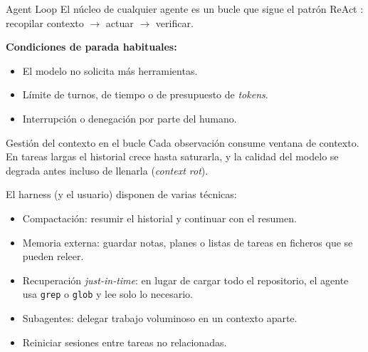 \begin{frame}{Agent Loop}
El núcleo de cualquier agente es un \alert{bucle} que sigue el patrón ReAct \cite{yao2023react}: \alert{recopilar contexto $\rightarrow$ actuar $\rightarrow$ verificar}.
 
\begin{figure}
    \centering
\end{figure}
 
\textbf{Condiciones de parada habituales:}
\begin{itemize}
    \item El modelo no solicita más herramientas.
    \item Límite de turnos, de tiempo o de presupuesto de \textit{tokens}.
    \item Interrupción o denegación por parte del humano.
\end{itemize}
\end{frame}
 
\begin{frame}{Gestión del contexto en el bucle}
Cada observación \alert{consume ventana de contexto}. En tareas largas el historial crece hasta saturarla, y la calidad del modelo se degrada antes incluso de llenarla (\textit{context rot}).
 
El harness (y el usuario) disponen de varias técnicas:
\begin{itemize}
    \item \alert{Compactación:} resumir el historial y continuar con el resumen.
    \item \alert{Memoria externa:} guardar notas, planes o listas de tareas en \alert{ficheros} que se pueden releer.
    \item \alert{Recuperación \textit{just-in-time}:} en lugar de cargar todo el repositorio, el agente usa \texttt{grep} o \texttt{glob} y lee solo lo necesario.
    \item \alert{Subagentes:} delegar trabajo voluminoso en un contexto aparte.
    \item \alert{Reiniciar sesiones} entre tareas no relacionadas.
\end{itemize}
\end{frame}
 
